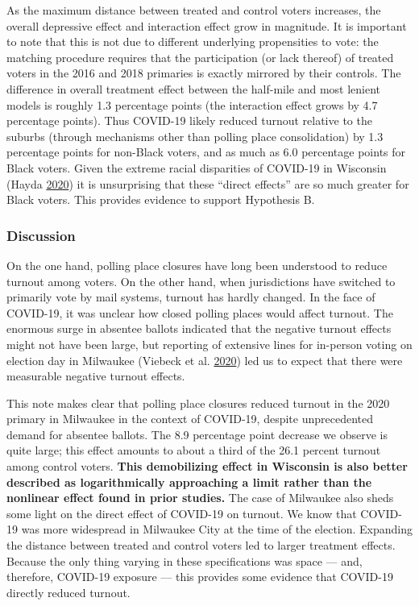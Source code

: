 \documentclass[
  12pt,
]{article}
\begin{document}
As the maximum distance between treated and control voters increases, the overall depressive effect and interaction effect grow in magnitude. It is important to note that this is not due to different underlying propensities to vote: the matching procedure requires that the participation (or lack thereof) of treated voters in the 2016 and 2018 primaries is exactly mirrored by their controls. The difference in overall treatment effect between the half-mile and most lenient models is roughly 1.3 percentage points (the interaction effect grows by 4.7 percentage points). Thus COVID-19 likely reduced turnout relative to the suburbs (through mechanisms other than polling place consolidation) by 1.3 percentage points for non-Black voters, and as much as 6.0 percentage points for Black voters. Given the extreme racial disparities of COVID-19 in Wisconsin (Hayda \protect\hyperlink{ref-Hayda2020}{2020}) it is unsurprising that these ``direct effects'' are so much greater for Black voters. This provides evidence to support Hypothesis B.

\hypertarget{discussion}{%
\subsubsection*{Discussion}\label{discussion}}

On the one hand, polling place closures have long been understood to reduce turnout among voters. On the other hand, when jurisdictions have switched to primarily vote by mail systems, turnout has hardly changed. In the face of COVID-19, it was unclear how closed polling places would affect turnout. The enormous surge in absentee ballots indicated that the negative turnout effects might not have been large, but reporting of extensive lines for in-person voting on election day in Milwaukee (Viebeck et al. \protect\hyperlink{ref-Viebeck2020}{2020}) led us to expect that there were measurable negative turnout effects.

This note makes clear that polling place closures reduced turnout in the 2020 primary in Milwaukee in the context of COVID-19, despite unprecedented demand for absentee ballots. The 8.9 percentage point decrease we observe is quite large; this effect amounts to about a third of the 26.1 percent turnout among control voters. \textbf{This demobilizing effect in Wisconsin is also better described as logarithmically approaching a limit rather than the nonlinear effect found in prior studies.} The case of Milwaukee also sheds some light on the direct effect of COVID-19 on turnout. We know that COVID-19 was more widespread in Milwaukee City at the time of the election. Expanding the distance between treated and control voters led to larger treatment effects. Because the only thing varying in these specifications was space --- and, therefore, COVID-19 exposure --- this provides some evidence that COVID-19 directly reduced turnout.
\end{document}
